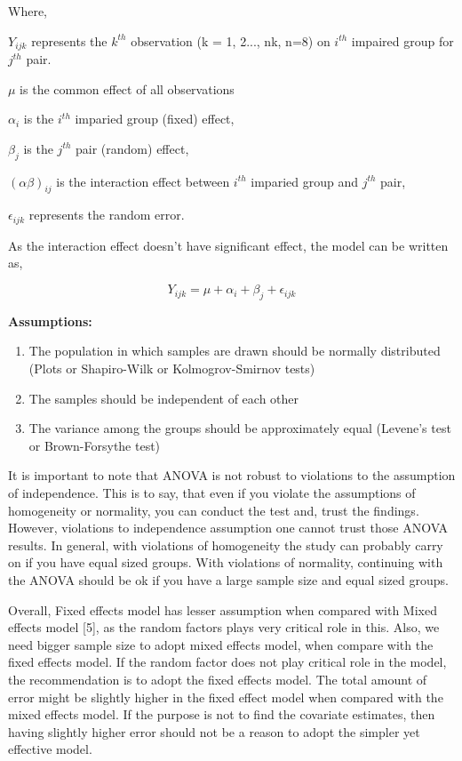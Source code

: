 \documentclass[final]{statistica}
\begin{document}
Where,
\par
$Y_{ijk}$ represents the $k^{th}$ observation (k = 1, 2..., nk, n=8) on $i^{th}$ impaired group for $j^{th}$ pair.
\par
$\mu$ is the common effect of all observations
\par
$\alpha_i$ is the $i^{th}$ imparied group (fixed) effect, 
\par
$\beta_j$ is the $j^{th}$ pair (random) effect,
\par
$(\alpha\beta)_{ij}$ is the interaction effect between $i^{th}$ imparied group and $j^{th}$ pair,
\par
$\epsilon_{ijk}$ represents the random error.
\vspace{3mm}
\par
As the interaction effect doesn’t have significant effect, the model can be written as,

\begin{equation}\label{eq4}
Y_{ijk} = {\mu + \alpha_i + \beta_j + \epsilon_{ijk}}
\end{equation}

\vspace{3mm}
\textbf{Assumptions:}
\begin{enumerate}
	\item The population in which samples are drawn should be normally distributed (Plots or Shapiro-Wilk or Kolmogrov-Smirnov tests)
    \item The samples should be independent of each other
    \item The variance among the groups should be approximately equal (Levene's test or Brown-Forsythe test)
\end{enumerate}

\par
It is important to note that ANOVA is not robust to violations to the assumption of independence. This is to say, that even if you violate the assumptions of homogeneity or normality, you can conduct the test and, trust the findings. However, violations to independence assumption one cannot trust those ANOVA results. In general, with violations of homogeneity the study can probably carry on if you have equal sized groups. With violations of normality, continuing with the ANOVA should be ok if you have a large sample size and equal sized groups.
\vspace{3mm}
\par
Overall, Fixed effects model has lesser assumption when compared with Mixed effects model [5], as the random factors plays very critical role in this. Also, we need bigger sample size to adopt mixed effects model, when compare with the fixed effects model. If the random factor does not play critical role in the model, the recommendation is to adopt the fixed effects model. The total amount of error might be slightly higher in the fixed effect model when compared with the mixed effects model. If the purpose is not to find the covariate estimates, then having slightly higher error should not be a reason to adopt the simpler yet effective model.
\end{document}
